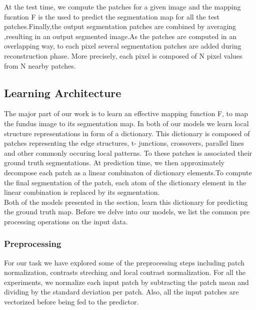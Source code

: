 At the test time, we compute the patches for a given image and the mapping fucntion F is the used to predict the segmentation map for all the test patches.Finally,the output segmentation patches are combined by averaging ,resulting in an output segmented image.As the patches are computed in an overlapping way, to each pixel several segmentation patches are added during reconstruction phase. More precisely, each pixel is composed of N pixel values from N nearby patches.\\

\subsection{Learning Architecture}
The major part of our work is to learn an effective mapping function F, to map the fundus image to its segmentation map. In both of our models we learn local structure representations in form of a dictionary. This dictionary is composed of patches representing the edge structures, t- junctions, crossovers, parallel lines and other commonly occuring local patterns. To these patches is associated their ground truth segmentations. At prediction time, we then approximately decompose each patch as a linear combinaton of dictionary elements.To compute the final segmentation of the patch, each atom of the dictionary element in the linear combination is replaced by its segmentation.\\

Both of the models presented in the section, learn this dictionary for predicting the ground truth map.
Before we delve into our models, we list the common pre processing operations on the input data.
 
\subsubsection{Preprocessing}
For our task we have explored some of the preprocessing steps including patch normalization, contrasts streching and local contrast normalization. For all the experiments, we normalize each input patch by subtracting the patch mean and dividing by the standard deviation per patch. Also, all the input patches are vectorized before being fed to the predictor.



